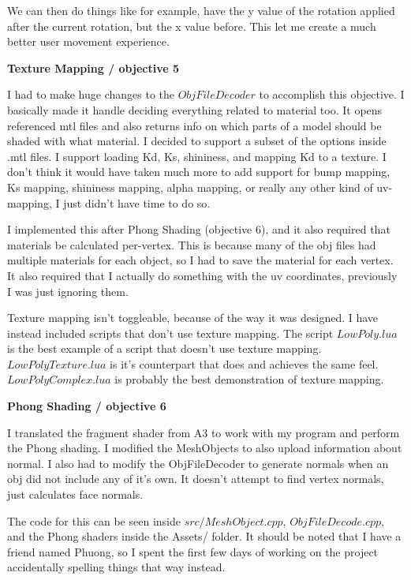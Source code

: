 \documentclass[10pt]{article}
\begin{document}
	We can then do things like for example, have the y value of the rotation applied after the current rotation, but the x value before. This let me create a much better user movement experience.
	
	\begin{center}
		\bf Texture Mapping / objective 5
	\end{center}
	
	I had to make huge changes to the $ObjFileDecoder$ to accomplish this objective. I basically made it handle deciding everything related to material too. It opens referenced mtl files and also returns info on which parts of a model should be shaded with what material. I decided to support a subset of the options inside .mtl files. I support loading Kd, Ks, shininess, and mapping Kd to a texture. I don't think it would have taken much more to add support for bump mapping, Ks mapping, shininess mapping, alpha mapping, or really any other kind of uv-mapping, I just didn't have time to do so.
	
	I implemented this after Phong Shading (objective 6), and it also required that materials be calculated per-vertex. This is because many of the obj files had multiple materials for each object, so I had to save the material for each vertex. It also required that I actually do something with the uv coordinates, previously I was just ignoring them.
	
	Texture mapping isn't toggleable, because of the way it was designed. I have instead included scripts that don't use texture mapping. The script $LowPoly.lua$ is the best example of a script that doesn't use texture mapping. $LowPolyTexture.lua$ is it's counterpart that does and achieves the same feel. $LowPolyComplex.lua$ is probably the best demonstration of texture mapping.
	
	\begin{center}
		\bf Phong Shading / objective 6
	\end{center}
	
	I translated the fragment shader from A3 to work with my program and perform the Phong shading. I modified the MeshObjects to also upload information about normal. I also had to modify the ObjFileDecoder to generate normals when an obj did not include any of it's own. It doesn't attempt to find vertex normals, just calculates face normals.
	
	The code for this can be seen inside $src/MeshObject.cpp$, $ObjFileDecode.cpp$, and the Phong shaders inside the Assets/ folder. It should be noted that I have a friend named Phuong, so I spent the first few days of working on the project accidentally spelling things that way instead.
	
\end{document}
